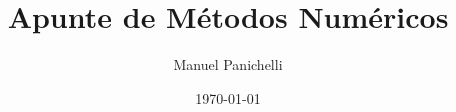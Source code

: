 \documentclass[11pt]{article}
\theoremstyle{definition} %
\begin{document}
\author{Manuel Panichelli}
\title{Apunte de Métodos Numéricos}
\date{\today}
\maketitle
\end{document}
